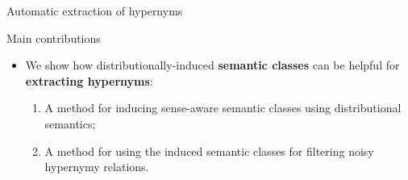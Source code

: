\documentclass[usenames,dvipsnames]{beamer}
\begin{document}
\begin{frame}{Automatic extraction of hypernyms}

 

\end{frame}


\begin{frame}{Main contributions}

\begin{itemize}
	\item We show how distributionally-induced \alert{\textbf{semantic classes}} can be helpful  for \alert{\textbf{extracting hypernyms}}:
	\pause
	\vspace{10pt}
	\begin{enumerate}
		\item A method for \alert{inducing sense-aware semantic classes} using distributional semantics; 
		\vspace{10pt}
		\item A method for using the induced semantic classes for \alert{filtering noisy hypernymy relations}.
	 \end{enumerate}
\end{itemize}
\end{frame}
\end{document}
